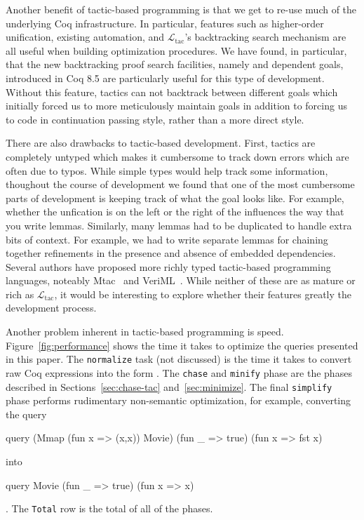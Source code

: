 \documentclass[preprint]{sigplanconf}
\newcommand{\ltac}[0]{\ensuremath{\mathcal{L}_{\mathrm{tac}}}}
\begin{document}
Another benefit of tactic-based programming is that we get to re-use much of the underlying Coq infrastructure.
In particular, features such as higher-order unification, existing automation, and \ltac's backtracking search mechanism are all useful when building optimization procedures.
We have found, in particular, that the new backtracking proof search facilities, namely \coqe{+} and dependent goals, introduced in Coq 8.5 are particularly useful for this type of development.
Without this feature, tactics can not backtrack between different goals which initially forced us to more meticulously maintain goals in addition to forcing us to code in continuation passing style, rather than a more direct style.

There are also drawbacks to tactic-based development.
First, tactics are completely untyped which makes it cumbersome to track down errors which are often due to typos.
While simple types would help track some information, thoughout the course of development we found that one of the most cumbersome parts of development is keeping track of what the goal looks like.
For example, whether the unfication is on the left or the right of the  influences the way that you write lemmas.
Similarly, many lemmas had to be duplicated to handle extra bits of context.
For example, we had to write separate lemmas for chaining together refinements in the presence and absence of embedded dependencies.
Several authors have proposed more richly typed tactic-based programming languages, noteably Mtac~\cite{ziliani2013mtac} and VeriML~\cite{stampoulis2010veriml}.
While neither of these are as mature or rich as \ltac, it would be interesting to explore whether their features greatly the development process.

Another problem inherent in tactic-based programming is speed.
Figure~\ref{fig:performance} shows the time it takes to optimize the queries presented in this paper.
The {\tt normalize} task (not discussed) is the time it takes to convert raw Coq expressions into the form .
The {\tt chase} and {\tt minify} phase are the phases described in Sections~\ref{sec:chase-tac} and~\ref{sec:minimize}.
The final {\tt simplify} phase performs rudimentary non-semantic optimization, for example, converting the query
\begin{coq}
query (Mmap (fun x => (x,x)) Movie) (fun _ => true)
      (fun x => fst x)
\end{coq}
into
\begin{coq}
query Movie (fun _ => true) (fun x => x)
\end{coq}
.
The {\tt Total} row is the total of all of the phases.
\end{document}
